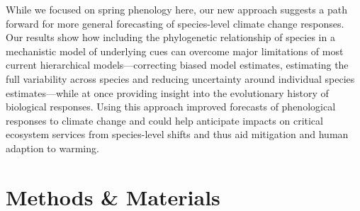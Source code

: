 \documentclass[11pt]{article}
\newcommand{\R}[1]{\label{}\linelabel{#1}}
\begin{document}
\R{whyuse3}While we focused on spring phenology here, our new \R{whatisyourpaper4}approach suggests a path forward for more general forecasting of species-level climate change responses. Our results show how including the phylogenetic relationship of species in a mechanistic model of underlying cues can overcome major limitations of most current hierarchical models---correcting biased model estimates, estimating the full variability across species and reducing uncertainty around individual species estimates---while at once providing insight into the evolutionary history of biological responses. Using this approach improved forecasts of phenological responses to climate change and could help anticipate impacts on critical ecosystem services from species-level shifts and thus aid mitigation and human adaption to warming. \R{whyuse3E}%




\clearpage
\section*{Methods \& Materials} 

\end{document}
